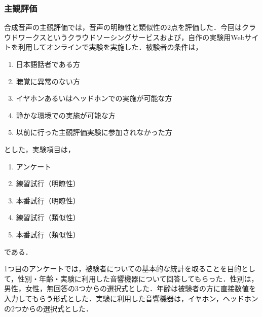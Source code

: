 \subsubsection{主観評価}
\label{sec4:sec:sbj_explanation}
合成音声の主観評価では，音声の明瞭性と類似性の2点を評価した．今回はクラウドワークスというクラウドソーシングサービスおよび，自作の実験用Webサイトを利用してオンラインで実験を実施した．被験者の条件は，
\begin{enumerate}
    \item 日本語話者である方
    \item 聴覚に異常のない方
    \item イヤホンあるいはヘッドホンでの実施が可能な方
    \item 静かな環境での実施が可能な方
    \item 以前に行った主観評価実験に参加されなかった方
\end{enumerate}
とした，実験項目は，
\begin{enumerate}
    \item アンケート
    \item 練習試行（明瞭性）
    \item 本番試行（明瞭性）
    \item 練習試行（類似性）
    \item 本番試行（類似性）
\end{enumerate}
である．

1つ目のアンケートでは，被験者についての基本的な統計を取ることを目的として，性別・年齢・実験に利用した音響機器について回答してもらった．性別は，男性，女性，無回答の3つからの選択式とした．年齢は被験者の方に直接数値を入力してもらう形式とした．実験に利用した音響機器は，イヤホン，ヘッドホンの2つからの選択式とした．

